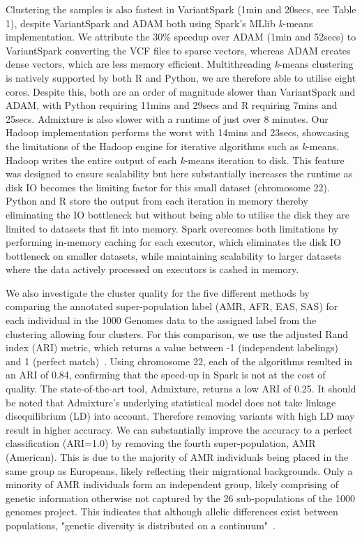 \documentclass{bmcart}
\newcommand{\variantSpark}{{\sc VariantSpark}}
\newcommand{\kMeans}{\textit{k}-means}
\newcommand{\ARI}{adjusted Rand index}
\begin{document}
Clustering the samples is also fastest in \variantSpark{} (1min and 20secs, see Table 1), despite \variantSpark{} and {\sc ADAM} both using {\sc Spark}'s MLlib \kMeans{} implementation. %
We attribute the 30\% speedup over {\sc ADAM} (1min and 52secs) to \variantSpark{} converting the VCF files to sparse vectors, whereas {\sc ADAM} creates dense vectors, which are less memory efficient. %
Multithreading \kMeans{} clustering is natively supported by both R and Python, we are therefore able to utilise eight cores. 
Despite this, both are an order of magnitude slower than \variantSpark{} and {\sc ADAM}, with Python requiring 11mins and 29secs and R requiring 7mins and 25secs.
{\sc Admixture} is also slower with a runtime of just over 8 minutes. 
Our Hadoop implementation performs the worst with 14mins and 23secs, showcasing the limitations of the Hadoop engine for iterative algorithms such as \kMeans{}. %
Hadoop writes the entire output of each \kMeans{} iteration to disk. This feature was designed to ensure scalability but here substantially increases the runtime as disk IO becomes the limiting factor for this small dataset (chromosome 22).
Python and R store the output from each iteration in memory thereby eliminating the IO bottleneck but without being able to utilise the disk they are limited to datasets that fit into memory.  
{\sc Spark} overcomes both limitations by performing in-memory caching for each executor, which eliminates the disk IO bottleneck on smaller datasets, while maintaining scalability to larger datasets where the data actively processed on executors is cashed in memory.

We also investigate the cluster quality for the five different methods by comparing the annotated super-population label (AMR, AFR, EAS, SAS) for each individual in the 1000 Genomes data to the assigned label from the clustering allowing four clusters. 
For this comparison, we use the \ARI{} (ARI) metric, which returns a value between -1 (independent labelings) and 1 (perfect match)~\cite{Hubert1985}.
Using chromosome 22, each of the algorithms resulted in an ARI of 0.84, confirming that the speed-up in {\sc Spark} is not at the cost of quality.
The state-of-the-art tool, {\sc Admixture}, returns a low ARI of 0.25. It should be noted that {\sc Admixture}'s underlying statistical model does not take linkage disequilibrium (LD) into account. 
Therefore removing variants with high LD may result in higher accuracy.   
We can substantially improve the accuracy to a perfect classification (ARI=1.0) by removing the fourth super-population, AMR (American). 
This is due to the majority of AMR individuals being placed in the same group as Europeans, likely reflecting their migrational backgrounds. 
Only a minority of AMR individuals form an independent group, likely comprising of genetic information otherwise not captured by the 26 sub-populations of the 1000 genomes project.
This indicates that although allelic differences exist between populations, "genetic diversity is distributed on a continuum"~\cite{Pugach2015}.
\end{document}
